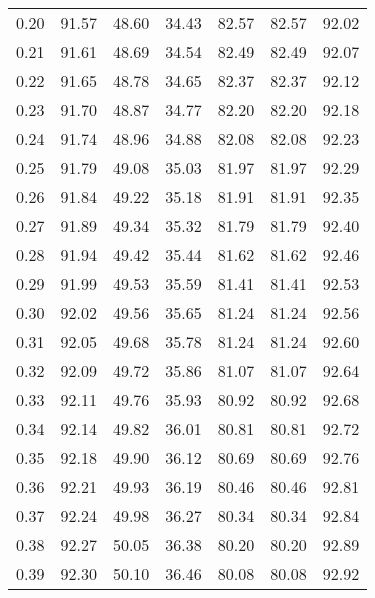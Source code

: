 \begin{tabular}{|c|c|c|c|c|c|c|}
      0.20 &     91.57 &     48.60 &      34.43 &   82.57 &      82.57 &         92.02 \\
      0.21 &     91.61 &     48.69 &      34.54 &   82.49 &      82.49 &         92.07 \\
      0.22 &     91.65 &     48.78 &      34.65 &   82.37 &      82.37 &         92.12 \\
      0.23 &     91.70 &     48.87 &      34.77 &   82.20 &      82.20 &         92.18 \\
      0.24 &     91.74 &     48.96 &      34.88 &   82.08 &      82.08 &         92.23 \\
      0.25 &     91.79 &     49.08 &      35.03 &   81.97 &      81.97 &         92.29 \\
      0.26 &     91.84 &     49.22 &      35.18 &   81.91 &      81.91 &         92.35 \\
      0.27 &     91.89 &     49.34 &      35.32 &   81.79 &      81.79 &         92.40 \\
      0.28 &     91.94 &     49.42 &      35.44 &   81.62 &      81.62 &         92.46 \\
      0.29 &     91.99 &     49.53 &      35.59 &   81.41 &      81.41 &         92.53 \\
      0.30 &     92.02 &     49.56 &      35.65 &   81.24 &      81.24 &         92.56 \\
      0.31 &     92.05 &     49.68 &      35.78 &   81.24 &      81.24 &         92.60 \\
      0.32 &     92.09 &     49.72 &      35.86 &   81.07 &      81.07 &         92.64 \\
      0.33 &     92.11 &     49.76 &      35.93 &   80.92 &      80.92 &         92.68 \\
      0.34 &     92.14 &     49.82 &      36.01 &   80.81 &      80.81 &         92.72 \\
      0.35 &     92.18 &     49.90 &      36.12 &   80.69 &      80.69 &         92.76 \\
      0.36 &     92.21 &     49.93 &      36.19 &   80.46 &      80.46 &         92.81 \\
      0.37 &     92.24 &     49.98 &      36.27 &   80.34 &      80.34 &         92.84 \\
      0.38 &     92.27 &     50.05 &      36.38 &   80.20 &      80.20 &         92.89 \\
      0.39 &     92.30 &     50.10 &      36.46 &   80.08 &      80.08 &         92.92 \\

\end{tabular}
